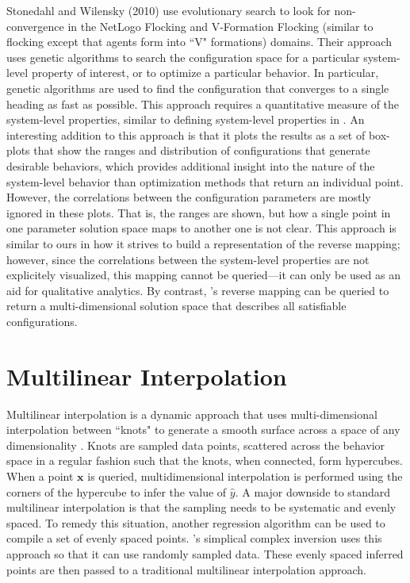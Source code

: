 Stonedahl and Wilensky (2010)\nocite{stonedahl} use evolutionary search to look for non-convergence in the NetLogo Flocking and V-Formation Flocking (similar to flocking except that agents form into ``V" formations) domains.
Their approach uses genetic algorithms to search the configuration space for a particular system-level property of interest, or to optimize a particular behavior.
In particular, genetic algorithms are used to find the configuration that converges to a single heading as fast as possible.
This approach requires a quantitative measure of the system-level properties, similar to defining system-level properties in \fw.
An interesting addition to this approach is that it plots the results as a set of box-plots that show the ranges and distribution of configurations that generate desirable behaviors, which provides additional insight into the nature of the system-level behavior than optimization methods that return an individual point.
However, the correlations between the configuration parameters are mostly ignored in these plots.
That is, the ranges are shown, but how a single point in one parameter solution space maps to another one is not clear.
This approach is similar to ours in how it strives to build a representation of the reverse mapping; however, since the correlations between the system-level properties are not explicitely visualized, this mapping cannot be queried---it can only be used as an aid for qualitative analytics.
By contrast, \fw's reverse mapping can be queried to return a multi-dimensional solution space that describes all satisfiable configurations.


\section{Multilinear Interpolation}
\label{sec:multilinear}

Multilinear interpolation is a dynamic approach that uses multi-dimensional interpolation between ``knots" to generate a smooth surface across a space of any dimensionality \cite{davies1997multidimensional}.
Knots are sampled data points, scattered across the behavior space in a regular fashion such that the knots, when connected, form hypercubes.
When a point $\mathbf x$ is queried, multidimensional interpolation is performed using the corners of the hypercube to infer the value of $\hat y$.
A major downside to standard multilinear interpolation is that the sampling needs to be systematic and evenly spaced.
To remedy this situation, another regression algorithm can be used to compile a set of evenly spaced points.
\fw's simplical complex inversion uses this approach so that it can use randomly sampled data.
These evenly spaced inferred points are then passed to a traditional multilinear interpolation approach.

